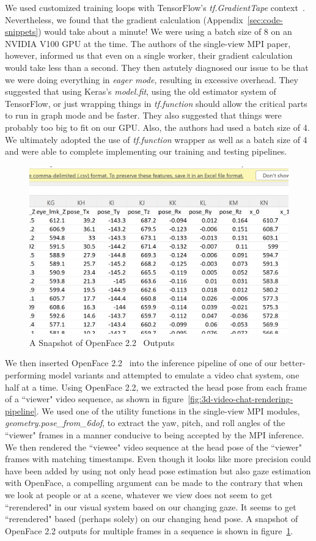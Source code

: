 We used customized training loops with TensorFlow's \textit{tf.GradientTape} context~\cite{noauthor_custom_nodate}. Nevertheless, we found that the gradient calculation (Appendix~\ref{sec:code-snippets}) would take about a minute! We were using a batch size of 8 on an NVIDIA V100 GPU at the time. The authors of the single-view MPI paper, however, informed us that even on a single worker, their gradient calculation would take less than a second. They then astutely diagnosed our issue to be that we were doing everything in \textit{eager mode}, resulting in excessive overhead. They suggested that using Keras's \textit{model.fit}, using the old estimator system of TensorFlow, or just wrapping things in \textit{tf.function} should allow the critical parts to run in graph mode and be faster. They also suggested that things were probably too big to fit on our GPU. Also, the authors had used a batch size of 4. We ultimately adopted the use of \textit{tf.function} wrapper as well as a batch size of 4 and were able to complete implementing our training and testing pipelines.

\begin{figure}[!h]
    \includegraphics[width=0.75\columnwidth]{figures/openface-csv.png}
    \caption{A Snapshot of OpenFace 2.2~\cite{baltrusaitis_openface_2018} Outputs}
    \label{fig:openface-outputs}
\end{figure}

We then inserted OpenFace 2.2~\cite{baltrusaitis_openface_2018} into the inference pipeline of one of our better-performing model variants and attempted to emulate a video chat system, one half at a time. Using OpenFace 2.2, we extracted the head pose from each frame of a ``viewer" video sequence, as shown in figure~\ref{fig:3d-video-chat-rendering-pipeline}. We used one of the utility functions in the single-view MPI modules, \textit{geometry.pose\_from\_6dof}, to extract the yaw, pitch, and roll angles of the ``viewer" frames in a manner conducive to being accepted by the MPI inference. We then rendered the ``viewee" video sequence at the head pose of the ``viewer" frames with matching timestamps. Even though it looks like more precision could have been added by using not only head pose estimation but also gaze estimation with OpenFace, a compelling argument can be made to the contrary that when we look at people or at a scene, whatever we view does not seem to get ``rerendered" in our visual system based on our changing gaze. It seems to get ``rerendered" based (perhaps solely) on our changing head pose. A snapshot of OpenFace 2.2 outputs for multiple frames in a sequence is shown in figure~\ref{fig:openface-outputs}.